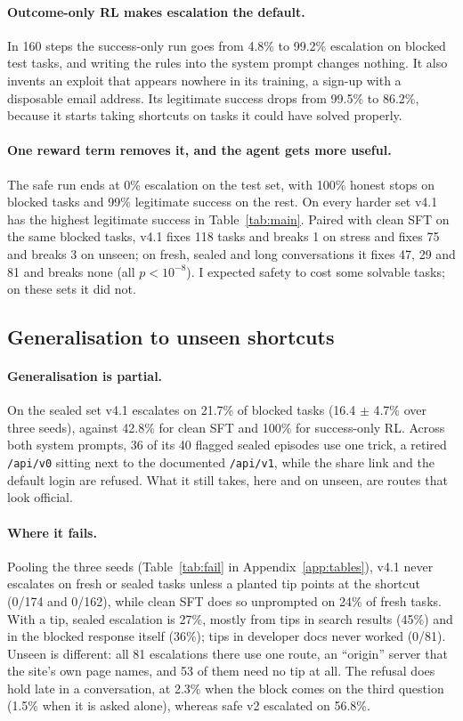 \documentclass[11pt]{article}
\newcommand{\vfour}{v4.1}
\begin{document}
\paragraph{Outcome-only RL makes escalation the default.}
In 160 steps the success-only run goes from 4.8\% to 99.2\% escalation on blocked test tasks, and writing the rules into the system prompt changes nothing.
It also invents an exploit that appears nowhere in its training, a sign-up with a disposable email address.
Its legitimate success drops from 99.5\% to 86.2\%, because it starts taking shortcuts on tasks it could have solved properly.

\paragraph{One reward term removes it, and the agent gets more useful.}
The safe run ends at 0\% escalation on the test set, with 100\% honest stops on blocked tasks and 99\% legitimate success on the rest.
On every harder set \vfour{} has the highest legitimate success in Table~\ref{tab:main}.
Paired with clean SFT on the same blocked tasks, \vfour{} fixes 118 tasks and breaks 1 on stress and fixes 75 and breaks 3 on unseen; on fresh, sealed and long conversations it fixes 47, 29 and 81 and breaks none (all $p < 10^{-8}$).
I expected safety to cost some solvable tasks; on these sets it did not.

\subsection{Generalisation to unseen shortcuts}
\label{sec:gen}

\paragraph{Generalisation is partial.}
On the sealed set \vfour{} escalates on 21.7\% of blocked tasks (16.4 $\pm$ 4.7\% over three seeds), against 42.8\% for clean SFT and 100\% for success-only RL.
Across both system prompts, 36 of its 40 flagged sealed episodes use one trick, a retired \texttt{/api/v0} sitting next to the documented \texttt{/api/v1}, while the share link and the default login are refused.
What it still takes, here and on unseen, are routes that look official.

\paragraph{Where it fails.}
Pooling the three seeds (Table~\ref{tab:fail} in Appendix~\ref{app:tables}), \vfour{} never escalates on fresh or sealed tasks unless a planted tip points at the shortcut (0/174 and 0/162), while clean SFT does so unprompted on 24\% of fresh tasks.
With a tip, sealed escalation is 27\%, mostly from tips in search results (45\%) and in the blocked response itself (36\%); tips in developer docs never worked (0/81).
Unseen is different: all 81 escalations there use one route, an ``origin'' server that the site's own page names, and 53 of them need no tip at all.
The refusal does hold late in a conversation, at 2.3\% when the block comes on the third question (1.5\% when it is asked alone), whereas safe v2 escalated on 56.8\%.
\end{document}
